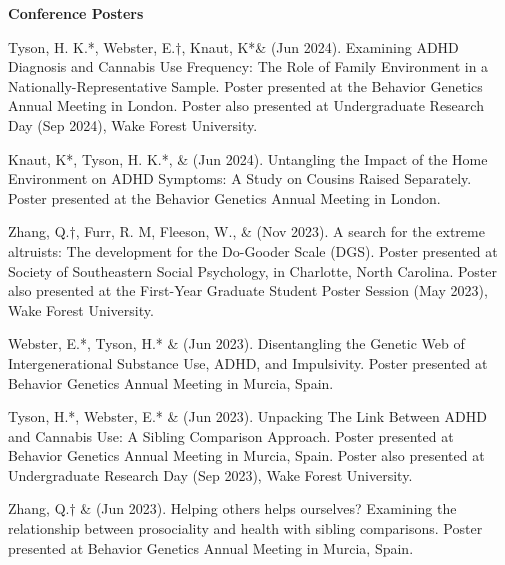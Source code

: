 {\large {\bf Conference Posters}}
\begin{etaremune}

\item Tyson, H. K.*, Webster, E.$\dagger$, Knaut, K*\& \meb (Jun 2024). Examining ADHD Diagnosis and Cannabis Use Frequency: The Role of Family Environment in a Nationally-Representative Sample. Poster presented at the Behavior Genetics Annual Meeting in London. Poster also presented at Undergraduate Research Day (Sep 2024), Wake Forest University.

\item Knaut, K*, Tyson, H. K.*, \& \meb (Jun 2024). Untangling the Impact of the Home Environment on ADHD Symptoms: A Study on Cousins Raised Separately. Poster presented at the Behavior Genetics Annual Meeting in London.

\item Zhang, Q.$\dagger$, Furr, R. M, Fleeson, W., \& \meb (Nov 2023). A search for the extreme altruists: The development for the Do-Gooder Scale (DGS). Poster presented at Society of Southeastern Social Psychology, in Charlotte, North Carolina. Poster also presented at the First-Year Graduate Student Poster Session (May 2023), Wake Forest University. %


\item Webster, E.*, Tyson, H.* \& \meb (Jun 2023). Disentangling the Genetic Web of Intergenerational Substance Use, ADHD, and Impulsivity. Poster presented at Behavior Genetics Annual Meeting in Murcia, Spain.

\item Tyson, H.*, Webster, E.*  \& \meb (Jun 2023). Unpacking The Link Between ADHD and Cannabis Use: A Sibling Comparison Approach. Poster presented at Behavior Genetics Annual Meeting in Murcia, Spain. Poster also presented at Undergraduate Research Day (Sep 2023), Wake Forest University.

\item Zhang, Q.$\dagger$ \& \meb (Jun 2023). Helping others helps ourselves? Examining the relationship between prosociality and health with sibling comparisons. Poster presented at Behavior Genetics Annual Meeting in Murcia, Spain.


\end{etaremune}
